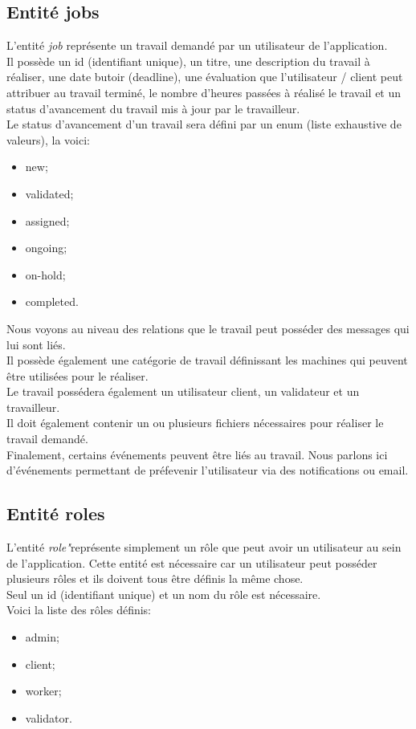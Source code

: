 \documentclass[
    iai, %
    il, %
]{heig-tb}
\begin{document}
\subsection{Entité jobs}
L'entité \emph{job} représente un travail demandé par un utilisateur de l'application.\\
Il possède un id (identifiant unique), un titre, une description du travail à réaliser, une date butoir (deadline), une évaluation que l'utilisateur / client peut attribuer au travail terminé, le nombre d'heures passées à réalisé le travail et un status d'avancement du travail mis à jour par le travailleur.\\
Le status d'avancement d'un travail sera défini par un enum (liste exhaustive de valeurs), la voici:
\begin{itemize}
    \item new;
    \item validated;
    \item assigned;
    \item ongoing;
    \item on-hold;
    \item completed.
\end{itemize}

Nous voyons au niveau des relations que le travail peut posséder des messages qui lui sont liés.\\
Il possède également une catégorie de travail définissant les machines qui peuvent être utilisées pour le réaliser.\\
Le travail possédera également un utilisateur client, un validateur et un travailleur.\\
Il doit également contenir un ou plusieurs fichiers nécessaires pour réaliser le travail demandé.\\
Finalement, certains événements peuvent être liés au travail. Nous parlons ici d'événements permettant de préfevenir l'utilisateur via des notifications ou email.

\subsection{Entité roles}
L'entité \emph{role"}représente simplement un rôle que peut avoir un utilisateur au sein de l'application. Cette entité est nécessaire car un utilisateur peut posséder plusieurs rôles et ils doivent tous être définis la même chose.\\
Seul un id (identifiant unique) et un nom du rôle est nécessaire.\\
Voici la liste des rôles définis:
\begin{itemize}
    \item admin;
    \item client;
    \item worker;
    \item validator.
\end{itemize}
\end{document}
